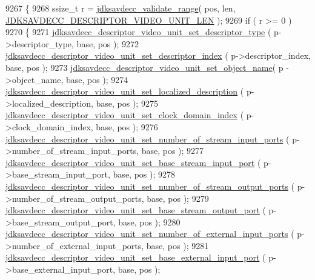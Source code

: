 \begin{DoxyCode}
9267 \{
9268     ssize\_t r = \hyperlink{group__util_ga9c02bdfe76c69163647c3196db7a73a1}{jdksavdecc\_validate\_range}( pos, len, 
      \hyperlink{group__descriptor__video_ga7748447728321b40379327f279dca7de}{JDKSAVDECC\_DESCRIPTOR\_VIDEO\_UNIT\_LEN} );
9269     \textcolor{keywordflow}{if} ( r >= 0 )
9270     \{
9271         \hyperlink{group__descriptor__video_gad99b359987064c159ab6a8b550fa37bd}{jdksavdecc\_descriptor\_video\_unit\_set\_descriptor\_type}
      ( p->descriptor\_type, base, pos );
9272         \hyperlink{group__descriptor__video_ga18268a1d42339769a770d537fb6a86f6}{jdksavdecc\_descriptor\_video\_unit\_set\_descriptor\_index}
      ( p->descriptor\_index, base, pos );
9273         \hyperlink{group__descriptor__video_ga90a564a1d47c1533b56c5ae21ced2b6e}{jdksavdecc\_descriptor\_video\_unit\_set\_object\_name}( p
      ->object\_name, base, pos );
9274         \hyperlink{group__descriptor__video_ga0cd32ebc3a78b8837a687dba54d82f18}{jdksavdecc\_descriptor\_video\_unit\_set\_localized\_description}
      ( p->localized\_description, base, pos );
9275         \hyperlink{group__descriptor__video_ga1130aad26c064608acef5e32b4f069a6}{jdksavdecc\_descriptor\_video\_unit\_set\_clock\_domain\_index}
      ( p->clock\_domain\_index, base, pos );
9276         \hyperlink{group__descriptor__video_ga8cc35afda6dea1ca2131c761b3813157}{jdksavdecc\_descriptor\_video\_unit\_set\_number\_of\_stream\_input\_ports}
      ( p->number\_of\_stream\_input\_ports, base, pos );
9277         \hyperlink{group__descriptor__video_gae40baa21b76cabbe5037b7511004105d}{jdksavdecc\_descriptor\_video\_unit\_set\_base\_stream\_input\_port}
      ( p->base\_stream\_input\_port, base, pos );
9278         \hyperlink{group__descriptor__video_ga2d9888609972ad47801c552e82b56475}{jdksavdecc\_descriptor\_video\_unit\_set\_number\_of\_stream\_output\_ports}
      ( p->number\_of\_stream\_output\_ports, base, pos );
9279         \hyperlink{group__descriptor__video_gab464b49f8d437e0d210495ed4c35e7b4}{jdksavdecc\_descriptor\_video\_unit\_set\_base\_stream\_output\_port}
      ( p->base\_stream\_output\_port, base, pos );
9280         \hyperlink{group__descriptor__video_gab8314a46c6a109ac5d01ae5dde43bf85}{jdksavdecc\_descriptor\_video\_unit\_set\_number\_of\_external\_input\_ports}
      ( p->number\_of\_external\_input\_ports, base, pos );
9281         \hyperlink{group__descriptor__video_ga605527196ab0327ebfd39f5c88c9bd66}{jdksavdecc\_descriptor\_video\_unit\_set\_base\_external\_input\_port}
      ( p->base\_external\_input\_port, base, pos );

\end{DoxyCode}
